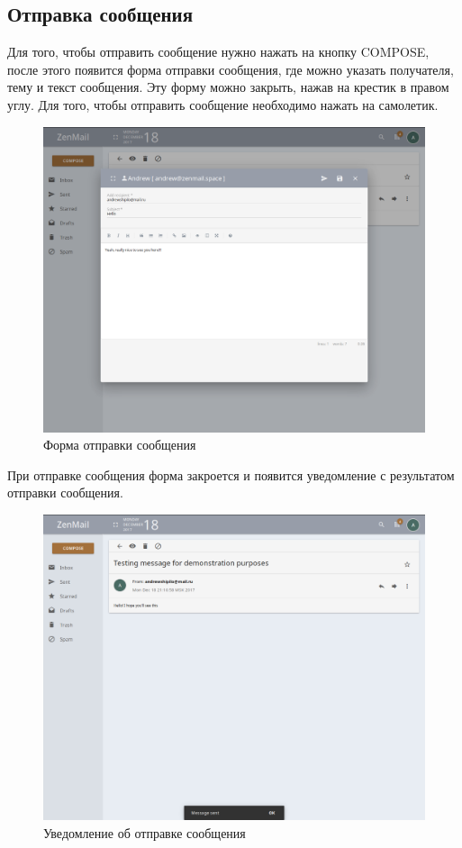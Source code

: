 \documentclass{article}
\begin{document}
\subsection{Отправка сообщения}
Для того, чтобы отправить сообщение нужно нажать на кнопку COMPOSE, после этого появится форма отправки сообщения, где можно указать получателя, тему и текст сообщения. Эту форму можно закрыть, нажав на крестик в правом углу. Для того, чтобы отправить сообщение необходимо нажать на самолетик.

\begin{figure}[H]
        \begin{flushleft}        \centerline{\includegraphics[scale=0.6]{sendmessage.png}}
        \caption{Форма отправки сообщения}
        \end{flushleft}
\end{figure}

При отправке сообщения форма закроется и появится уведомление с результатом отправки сообщения.

\begin{figure}[H]
        \begin{flushleft}        \centerline{\includegraphics[scale=0.6]{messagesent.png}}
        \caption{Уведомление об отправке сообщения}
        \end{flushleft}
\end{figure}

\newpage
\end{document}
